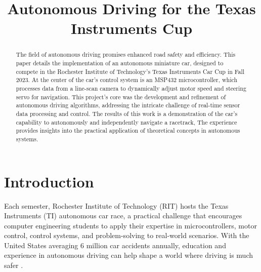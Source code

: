 \documentclass[conference]{IEEEtran}
\begin{document}
\title{Autonomous Driving for the Texas Instruments Cup}

\author{
\and
{}
}

\maketitle

\begin{abstract}
	The field of autonomous driving promises enhanced road safety and efficiency. This paper details the implementation of an autonomous miniature car, designed to compete in the Rochester Institute of Technology's Texas Instruments Car Cup in Fall 2023. At the center of the car's control system is an MSP432 microcontroller, which processes data from a line-scan camera to dynamically adjust motor speed and steering servo for navigation. This project's core was the development and refinement of autonomous driving algorithms, addressing the intricate challenge of real-time sensor data processing and control. The results of this work is a demonstration of the car's capability to autonomously and independently navigate a racetrack, The experience provides insights into the practical application of theoretical concepts in autonomous systems.
\end{abstract}

\section{Introduction}
Each semester, Rochester Institute of Technology (RIT) hosts the Texas Instruments (TI) autonomous car race, a practical challenge that encourages computer engineering students to apply their expertise in microcontrollers, motor control, control systems, and problem-solving to real-world scenarios. With the United States averaging 6 million car accidents annually, education and experience in autonomous driving can help shape a world where driving is much safer \cite{accidentStats}.
\end{document}
